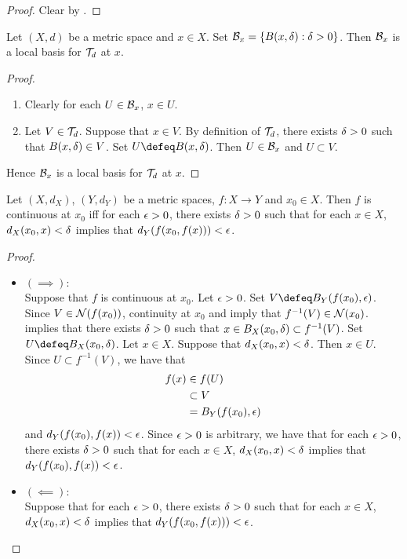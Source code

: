 \documentclass{book}
\begin{document}
\begin{proof}
	Clear by . 
\end{proof}

\begin{ex} 
	Let $(X,d)$ be a metric space and $x \in X$. Set $\mathcal{B}_x = \{B(x, \delta): \delta > 0\}$. Then $\mathcal{B}_x$ is a local basis for $\mathcal{T}_d$ at $x$. \\
\end{ex}	

\begin{proof}\
	\begin{enumerate}
		\item Clearly for each $U \in \mathcal{B}_x$, $x \in U$. 
		\item Let $V \in \mathcal{T}_d$. Suppose that $x \in V$. By definition of $\mathcal{T}_d$, there exists $\delta > 0$ such that $B(x, \delta) \in V$. Set $U \defeq B(x, \del)$. Then $U \in \mathcal{B}_x$ and $U \subset V$.
	\end{enumerate}
	Hence $\mathcal{B}_x$ is a local basis for $\mathcal{T}_d$ at $x$.
\end{proof}

\begin{ex} 
	Let $(X, d_X)$, $(Y, d_Y)$ be a metric spaces, $f: X \rightarrow Y$ and $x_0 \in X$. Then $f$ is continuous at $x_0$ iff for each $\epsilon > 0$, there exists $\delta > 0$ such that for each $x \in X$, $d_X(x_0, x) < \delta$ implies that $d_Y(f(x_0, f(x))) < \epsilon$. 
\end{ex}

\begin{proof}\
	\begin{itemize}
		\item $(\implies):$ \\
		Suppose that $f$ is continuous at $x_0$. Let $\epsilon > 0$. Set $V \defeq B_Y(f(x_0), \ep)$. Since $V \in \mathcal{N}(f(x_0))$, continuity at $x_0$ and  imply that $f^{-1}(V) \in \mathcal{N}(x_0)$.  implies that there exists $\delta > 0$ such that $x \in B_X(x_0, \delta) \subset f^{-1}(V)$. Set $U \defeq B_X(x_0, \del)$. Let $x \in X$. Suppose that $d_X(x_0, x) < \delta$. Then $x \in U$. Since $U \subset f^{-1}(V)$, we have that 
		\begin{align*}
			f(x) 
			& \in f(U) \\
			& \subset V \\
			& = B_Y(f(x_0), \epsilon)
		\end{align*}
		and $d_Y(f(x_0), f(x)) < \epsilon$. Since $\epsilon > 0$ is arbitrary, we have that for each $\epsilon >0$, there exists $\delta > 0$ such that for each $x \in X$, $d_X(x_0, x) < \delta$ implies that $d_Y(f(x_0), f(x)) < \epsilon$. 
		\item $(\impliedby):$ \\
		Suppose that for each $\epsilon > 0$, there exists $\delta > 0$ such that for each $x \in X$, $d_X(x_0, x) < \delta$ implies that $d_Y(f(x_0, f(x))) < \epsilon$. \tcr{FINISH!!!}
	\end{itemize}
\end{proof}
\end{document}
